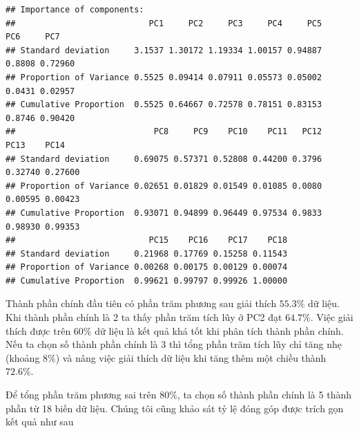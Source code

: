 \documentclass[../thesis.tex]{subfiles}
\begin{document}
\begin{Shaded}
	\begin{Highlighting}[]
  \NormalTok{, } \NormalTok{) }\SpecialCharTok{\%\textgreater{}\%} 
	\NormalTok{()}
	\end{Highlighting}
\end{Shaded}

\begin{verbatim}
## Importance of components:
##                           PC1     PC2     PC3     PC4     PC5    PC6     PC7
## Standard deviation     3.1537 1.30172 1.19334 1.00157 0.94887 0.8808 0.72960
## Proportion of Variance 0.5525 0.09414 0.07911 0.05573 0.05002 0.0431 0.02957
## Cumulative Proportion  0.5525 0.64667 0.72578 0.78151 0.83153 0.8746 0.90420
##                            PC8     PC9    PC10    PC11   PC12    PC13    PC14
## Standard deviation     0.69075 0.57371 0.52808 0.44200 0.3796 0.32740 0.27600
## Proportion of Variance 0.02651 0.01829 0.01549 0.01085 0.0080 0.00595 0.00423
## Cumulative Proportion  0.93071 0.94899 0.96449 0.97534 0.9833 0.98930 0.99353
##                           PC15    PC16    PC17    PC18
## Standard deviation     0.21968 0.17769 0.15258 0.11543
## Proportion of Variance 0.00268 0.00175 0.00129 0.00074
## Cumulative Proportion  0.99621 0.99797 0.99926 1.00000
\end{verbatim}

Thành phần chính đầu tiên có phần trăm phương sau giải thích $ 55.3\% $ dữ liệu. Khi thành phần chính là 2 ta thấy phần trăm tích lũy ở \textsf{PC2} đạt $ 64.7\% $. Việc giải thích được trên $ 60\% $ dữ liệu là kết quả khá tốt khi phân tích thành phần chính. Nếu ta chọn số thành phần chính là 3 thì tổng phần trăm tích lũy chỉ tăng nhẹ (khoảng $ 8\% $) và nâng việc giải thích dữ liệu khi tăng thêm một chiều thành $ 72.6\% $. 

Để tổng phần trăm phương sai trên $ 80\% $, ta chọn số thành phần chính là 5 thành phần từ 18 biến dữ liệu. Chúng tôi cũng khảo sát tỷ lệ đóng góp được trích gọn kết quả như sau

\begin{Shaded}
	\begin{Highlighting}[]
 \NormalTok{) }\SpecialCharTok{\%\textgreater{}\%} 
	\NormalTok{()}
	\end{Highlighting}
\end{Shaded}
\end{document}
